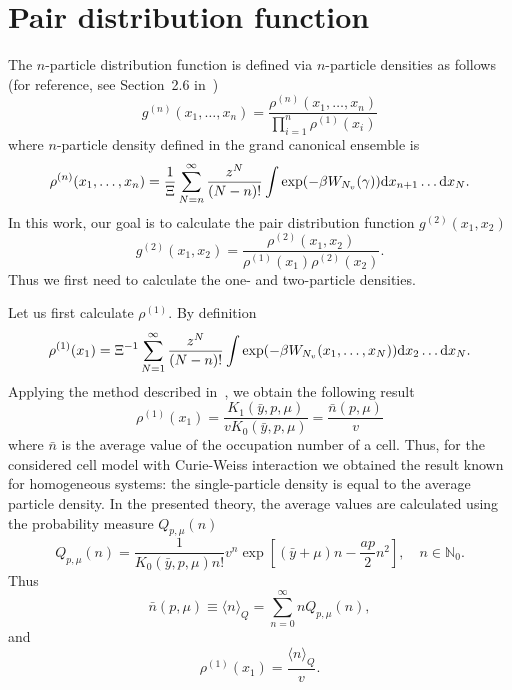 \section{\label{sec:init-pair-distribution} Pair distribution function}
The $n$-particle distribution function is defined via $n$-particle densities as follows (for reference, see Section~2.6 in~\cite{hansen2013theory})
\begin{equation*}
	\label{def:g_n}
	g^{(n)}(x_1,\dotsc,x_n)=\frac{\rho^{(n)}(x_1,\dotsc,x_n)}{\prod_{i=1}^{n}\rho^{(1)}(x_i)}
\end{equation*}
where $n$-particle density defined in the grand canonical ensemble is
\begin{eqnarray*}
	\label{def:rho_n}
	\rho^{(n)}(x_1,\dotsc,x_n) = \frac{1}{\Xi}\sum_{N=n}^{\infty} \frac{z^N}{(N-n)!} \int\exp(-\beta W_{N_v}(\gamma)) {\rm d} x_{n+1} \dotsc {\rm d} x_N.
\end{eqnarray*}
In this work, our goal is to calculate the pair distribution function $g^{(2)}(x_1, x_2)$
\begin{equation*}
	g^{(2)}(x_1, x_2) = \frac{\rho^{(2)}(x_1, x_2)}{\rho^{(1)}(x_1) \rho^{(2)}(x_2)}.
\end{equation*}
Thus we first need to calculate the one- and two-particle densities.

Let us first calculate $\rho^{(1)}$. By definition
\begin{equation*}
	\rho^{(1)} (x_1) = \Xi^{-1} \sum_{N=1}^{\infty} \frac{z^N}{(N-n)!} \int \exp(-\beta W_{N_v}(x_1, \dotsc, x_N)) {\rm d} x_2 \dotsc {\rm d} x_N.
\end{equation*}
Applying the method described in~\cite{KKD2020}, we obtain the following result
\begin{equation*}
	\rho^{(1)} (x_1) = \frac{K_1(\bar{y}, p, \mu)}{v K_0(\bar{y},p,\mu)} = \frac{\bar{n}(p,\mu)}{v}
\end{equation*}
where $\bar{n}$ is the average value of the occupation number of a cell. Thus, for the considered cell model with Curie-Weiss interaction we obtained the result known for homogeneous systems: the single-particle density is equal to the average particle density. In the presented theory, the average values are calculated using the probability measure $Q_{p,\mu}(n)$
\begin{equation*}
	Q_{p,\mu}(n) = \frac{1}{K_0(\bar{y}, p, \mu) n!} v^n \exp\left[(\bar{y} + \mu)n - \frac{a p}{2}n^2 \right],
	\quad n \in \mathbb{N}_0.
\end{equation*}
Thus
\begin{equation*}
	\bar{n}(p, \mu) \equiv \langle n \rangle_{Q} = \sum_{n=0}^{\infty} n Q_{p, \mu}(n),
\end{equation*}
and 
\begin{equation}
	\rho^{(1)}(x_1) = \frac{\langle n \rangle_{Q}}{v}.
\end{equation}

